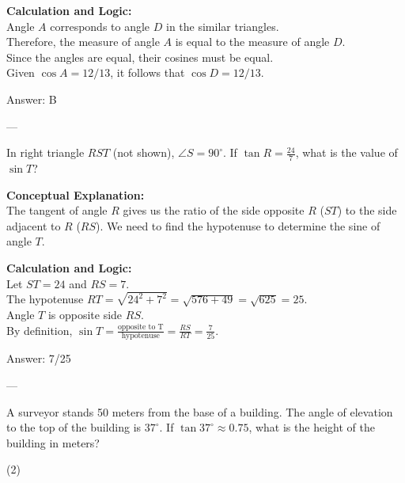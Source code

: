 \documentclass[11pt,paper=a4,answers]{exam}
\begin{document}
\begin{questions}
\begin{solution}
\vspace{10pt}
\textbf{Calculation and Logic:} \\
Angle $A$ corresponds to angle $D$ in the similar triangles. \\
Therefore, the measure of angle $A$ is equal to the measure of angle $D$. \\
Since the angles are equal, their cosines must be equal. \\
Given $\cos A = 12/13$, it follows that $\cos D = 12/13$.

\vspace{15pt}
Answer: \colorbox{yellow!100}{B}
\end{solution}

---

\question
In right triangle $RST$ (not shown), $\angle S = 90^\circ$. If $\tan R = \frac{24}{7}$, what is the value of $\sin T$?

\begin{solution}
\textbf{Conceptual Explanation:} \\
The tangent of angle $R$ gives us the ratio of the side opposite $R$ ($ST$) to the side adjacent to $R$ ($RS$). We need to find the hypotenuse to determine the sine of angle $T$.

\vspace{10pt}
\textbf{Calculation and Logic:} \\
Let $ST = 24$ and $RS = 7$. \\
The hypotenuse $RT = \sqrt{24^2 + 7^2} = \sqrt{576 + 49} = \sqrt{625} = 25$. \\
Angle $T$ is opposite side $RS$. \\
By definition, $\sin T = \frac{\text{opposite to T}}{\text{hypotenuse}} = \frac{RS}{RT} = \frac{7}{25}$.

\vspace{15pt}
Answer: \colorbox{yellow!100}{7/25}
\end{solution}

---

\question
A surveyor stands 50 meters from the base of a building. The angle of elevation to the top of the building is $37^\circ$. If $\tan 37^\circ \approx 0.75$, what is the height of the building in meters?
\begin{tasks}(2)
\end{tasks}


\end{questions}
\end{document}
